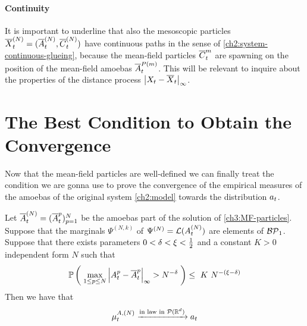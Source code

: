 \paragraph{Continuity}
It is important to underline that also the mesoscopic particles $\overline{X}_t^{(N)} = ( \overline{A}_t^{(N)} , \overline{C}_t^{(N)})$ have continuous paths in the sense of \ref{ch2:system-continuous-glueing}, because the mean-field particles $\overline{C}_t^m$ are spawning on the position of the mean-field amoebas $\overline{A}_t^{P(m)}$.
This will be relevant to inquire about the properties of the distance process $
	{ \left| X_t - \overline{X}_t \right|_{\infty} }$.

\section{The Best Condition to Obtain the Convergence}

Now that the mean-field particles are well-defined we can finally treat the condition we are gonna use to prove the convergence of the empirical measures of the amoebas of the original system \ref{ch2:model} towards the distribution $a_t$.

\begin{lemma}\label{ch3:best-condition-convergence}
	Let  $\overline{A}_t^{(N)}=(\overline{A}_t^p)_{p=1}^N$ be the amoebas part of the solution of \ref{ch3:MF-particles}.
	Suppose that the marginals $\Psi^{(N,k)}$ of $\Psi^{(N)}= \mathcal{L}(A_t^{(N)})$ are elements of $\mathcal{BP}_1$.
	Suppose that there exists parameters $0 < \delta < \xi < \frac{1}{2}$ and a constant $K > 0$ independent form $N$ such that
	\begin{equation}\label{ch3:condition-closeness}
		\mathbb{P} \left( \; \max_{1\leq p \leq N} { \left| A_t^p - \overline{A}_t^p \right|_{\infty} } > N^{-\delta}
		 \; \right)
		\leq\
		K\
		N^{-(\xi-\delta)}
	\end{equation}
	Then we have that
	\begin{equation*}
		\mu_t^{A,(N)}\xrightarrow{\text{in law in $\mathcal{P}(\mathbb{R}^d)$}} a_t
	\end{equation*}
\end{lemma}

